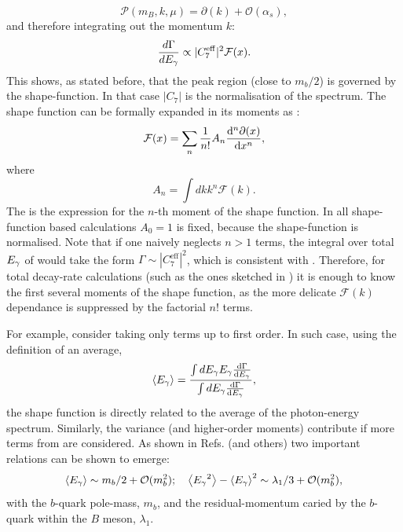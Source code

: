 \begin{equation}
    \mathcal{P}(m_B,k,\mu) = \partial(k) + \mathcal{O}(\alpha_s),
\end{equation}
and therefore integrating out the momentum $k$:
\begin{equation}\label{eq:integrated_egamma}
    \frac{d\Gamma}{d{E_{\gamma}}} \propto |C_7^{\mathrm{eff}}|^2 \mathcal{F}(x).
\end{equation}
This shows, as stated before, that the peak region (close to $m_b/2$) is governed by the shape-function.
In that case $|C_7|$ is the normalisation of the spectrum.
The shape function can be formally expanded in its moments as \cite{PhysRevD.50.2037,Ligeti:2008ac}:
\begin{equation}\label{eq:shape_function_expansion}
    \mathcal{F}(x) = \sum_n \frac{1}{n!} A_n \dv[n]{\partial(x)}{x},
\end{equation}
where 
\begin{equation}\label{eq:moments_of_shape_function}
    A_n = \int dk k^n \mathcal{F}(k).
\end{equation}
The  is the expression for the $n$-th moment of the shape function.
In all shape-function based calculations $A_0=1$ is fixed, because the shape-function is normalised.
Note that if one naively neglects $n>1$ terms, the integral over total ${E_{\gamma}}$ of  would take the form $\Gamma\sim|C_7^{\mathrm{eff}}|^2$, which is consistent with .
Therefore, for total decay-rate calculations (such as the ones sketched in ) it is enough to know the first several moments of the shape function, as the more delicate $\mathcal{F}(k)$ dependance is suppressed by the factorial $n!$ terms.

For example, consider taking only terms up to first order.
In such case, using the definition of an average,
\begin{equation}
    \expval{{\ensuremath{E_{\gamma}}}} = \frac{\int d{E_{\gamma}} {E_{\gamma}} \dv{\Gamma}{{\ensuremath{E_{\gamma}}}}}{\int d{E_{\gamma}} \dv{\Gamma}{{\ensuremath{E_{\gamma}}}}},
\end{equation}
the shape function is directly related to the average of the photon-energy spectrum.
Similarly, the variance (and higher-order moments) contribute if more terms from  are considered.
As shown in Refs.\cite{Bauer:1997fe,Kapustin:1995fk} (and others) two important relations can be shown to emerge:
\begin{equation}
    \expval{\Egamma} \sim m_b/2+\order(m_b^2); \quad \expval{\Egamma^2}-\expval{\Egamma}^2 \sim \lambda_1/3+\order(m_b^2),
\end{equation}
with the $b$-quark pole-mass, $m_b$, and the residual-momentum caried by the $b$-quark within the $B$ meson, $\lambda_1$.

